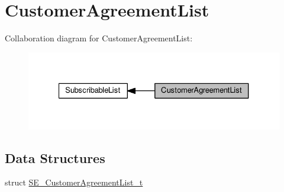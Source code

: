 \hypertarget{group__CustomerAgreementList}{}\section{Customer\+Agreement\+List}
\label{group__CustomerAgreementList}
Collaboration diagram for Customer\+Agreement\+List\+:\nopagebreak
\begin{figure}[H]
\begin{center}
\leavevmode
\includegraphics[width=327pt]{group__CustomerAgreementList}
\end{center}
\end{figure}
\subsection*{Data Structures}
\begin{DoxyCompactItemize}
\item 
struct \hyperlink{structSE__CustomerAgreementList__t}{S\+E\+\_\+\+Customer\+Agreement\+List\+\_\+t}
\end{DoxyCompactItemize}
